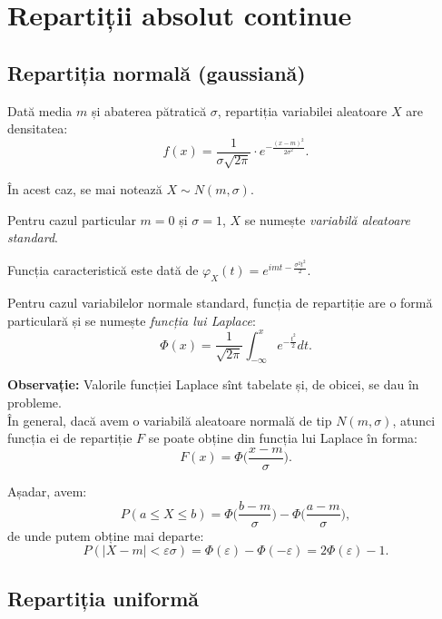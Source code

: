 \documentclass[12pt,a4paper]{article}
\theoremstyle{dotless}
\theoremstyle{dotlessdr}
\begin{document}

\section*{Repartiții absolut continue}

\subsection*{Repartiția normală (gaussiană)}

\indent\indent Dată media $ m $ și abaterea pătratică $ \sigma $, repartiția
variabilei aleatoare $ X $ are densitatea:
\[
  f(x) = \frac{1}{\sigma \sqrt{2\pi}} \cdot e^{-\frac{(x - m)^2}{2\sigma^2}}.
\]

În acest caz, se mai notează $ X \sim N(m, \sigma) $.

Pentru cazul particular $ m = 0 $ și $ \sigma = 1 $, $ X $ se numește
\emph{variabilă aleatoare standard}.

Funcția caracteristică este dată de $ \varphi_X(t) = e^{imt - \frac{\sigma^2 t^2}{2}}. $

Pentru cazul variabilelor normale standard, funcția de repartiție are o formă
particulară și se numește \emph{funcția lui Laplace}:
\[
  \Phi(x) = \frac{1}{\sqrt{2\pi}} \int_{-\infty}^x e^{-\frac{t^2}{2}} dt.
\]

\textbf{Observație:} Valorile funcției Laplace sînt tabelate și, de obicei,
se dau în probleme. \\

În general, dacă avem o variabilă aleatoare normală de tip $ N(m, \sigma) $, atunci
funcția ei de repartiție $ F $ se poate obține din funcția lui Laplace în forma:
\[
  F(x) = \Phi \Big( \frac{x - m}{\sigma} \Big).
\]

Așadar, avem:
\begin{equation}
  \label{eq:p-phi-lap}
  P(a \leq X \leq b) = \Phi \Big( \frac{b - m}{\sigma} \Big) - \Phi \Big( \frac{a - m}{\sigma} \Big),
\end{equation}
de unde putem obține mai departe:
\[
  P(|X - m| < \varepsilon \sigma) = \Phi(\varepsilon) - \Phi(-\varepsilon) = %
  2 \Phi(\varepsilon) - 1.
\]



\subsection*{Repartiția uniformă}
\end{document}
